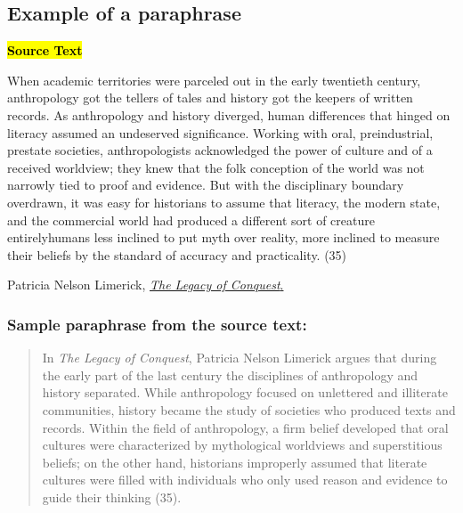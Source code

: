 \subsection{Example of a paraphrase}

\begin{tcolorbox}[enhanced,width=4.2in,left=.3in, right=.3in,
   drop fuzzy shadow southeast,
    boxrule=0.4pt,sharp corners,colframe=black!80!black,colback=white!10]

\medskip

{\small
\begin{doublespacing}
\textbf{\hl{Source Text}}
\smallskip

\hspace{.5cm}When academic territories were parceled out in the early twentieth century,
anthropology got the tellers of tales and history got the keepers of written
records. As anthropology and history diverged, human differences that
hinged on literacy assumed an undeserved significance. Working with oral,
preindustrial, prestate societies, anthropologists acknowledged the power
of culture and of a received worldview; they knew that the folk conception
of the world was not narrowly tied to proof and evidence. But with the
disciplinary boundary overdrawn, it was easy for historians to assume that
literacy, the modern state, and the commercial world had produced a different
sort of creature entirely\textemdash humans less inclined to put myth over reality,
more inclined to measure their beliefs by the standard of accuracy and
practicality. (35)

\bigskip

\noindent\textemdash Patricia Nelson Limerick, \href{http://libcat.dartmouth.edu/record=b1422593~S1}{\emph{The Legacy of Conquest}.
}

\bigskip

\end{doublespacing}}

\end{tcolorbox}


\subsubsection*{Sample paraphrase from the source text:}

\begin{quote}
In \emph{The Legacy of Conquest}, Patricia Nelson Limerick argues that during the
early part of the last century the disciplines of anthropology and history
separated. While anthropology focused on unlettered and illiterate communities,
history became the study of societies who produced texts and records. Within
the field of anthropology, a firm belief developed that oral cultures were
characterized by mythological worldviews and superstitious beliefs; on
the other hand, historians improperly assumed that literate cultures were filled with
individuals who only used reason and evidence to guide their thinking (35).
\end{quote}




